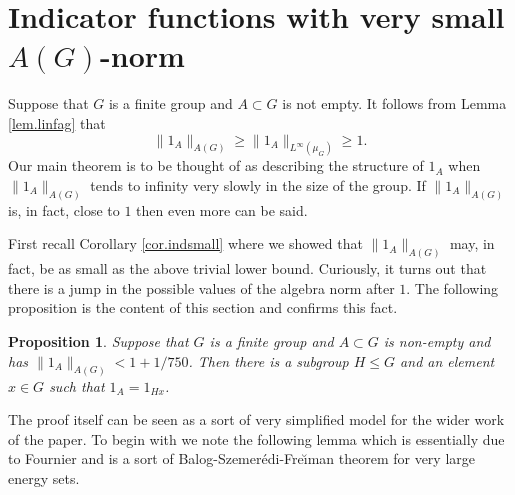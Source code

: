 \documentclass[12pt]{amsart}
\numberwithin{equation}{section}
\theoremstyle{plain}
\newtheorem{proposition}[subsection]{Proposition}
\theoremstyle{definition}
\renewcommand{\leq}{\leqslant}
\renewcommand{\geq}{\geqslant}
\begin{document}
\section{Indicator functions with very small $A(G)$-norm}\label{sec.sag}

Suppose that $G$ is a finite group and $A\subset G$ is not empty.  It follows from Lemma \ref{lem.linfag} that
\begin{equation*}
\|1_A\|_{A(G)} \geq \|1_A\|_{L^\infty(\mu_G)} \geq 1.
\end{equation*}
Our main theorem is to be thought of as describing the structure of $1_A$ when $\|1_A\|_{A(G)}$ tends to infinity very slowly in the size of the group.  If $\|1_A\|_{A(G)}$ is, in fact, close to $1$ then even more can be said.

First recall Corollary \ref{cor.indsmall} where we showed that $\|1_A\|_{A(G)}$ may, in fact, be as small as the above trivial lower bound.  Curiously, it turns out that there is a jump in the possible values of the algebra norm after $1$.  The following proposition is the content of this section and confirms this fact.
\begin{proposition}\label{prop.small}
Suppose that $G$ is a finite group and $A \subset G$ is non-empty and has $\|1_A\|_{A(G)} < 1+1/750$. Then there is a subgroup $H \leq G$ and an element $x \in G$ such that $1_A=1_{Hx}$. 
\end{proposition}
The proof itself can be seen as a sort of very simplified model for the wider work of the paper.  To begin with we note the following lemma which is essentially due to Fournier \cite{JJFF} and is a sort of Balog-Szemer{\'e}di-Fre{\u\i}man theorem for very large energy sets.
\end{document}
